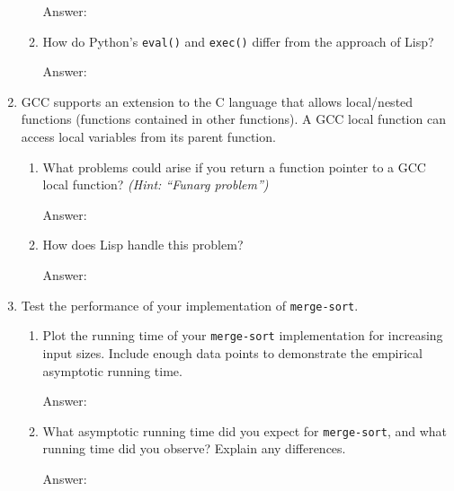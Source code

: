 \documentclass[12pt,letterpaper]{ntdhw}
\begin{document}
\begin{enumerate}
\begin{enumerate}
    \begin{emph}
      Answer: %
    \end{emph}

    \item How do Python's {\tt eval()} and {\tt exec()} differ from
    the approach of Lisp?

    \begin{emph}
      Answer: %
    \end{emph}
  \end{enumerate}

  \item GCC supports an extension to the C language that allows
  local/nested functions (functions contained in other functions).  A
  GCC local function can access local variables from its parent
  function.
  \begin{enumerate}
    \item What problems could arise if you return a function pointer
    to a GCC local function? \emph{(Hint: ``Funarg problem'')}

    \begin{emph}
      Answer: %
    \end{emph}

    \item How does Lisp handle this problem?

    \begin{emph}
      Answer: %
    \end{emph}

  \end{enumerate}


  \item Test the performance of your implementation of
    \texttt{merge-sort}.
    \begin{enumerate}
    \item Plot the running time of your \texttt{merge-sort}
      implementation for increasing input sizes.  Include enough data
      points to demonstrate the empirical asymptotic running time.

    \begin{emph}
      Answer: %
    \end{emph}

    \item What asymptotic running time did you expect for
      \texttt{merge-sort}, and what running time did you observe?
      Explain any differences.

    \begin{emph}
      Answer: %
    \end{emph}

    \end{enumerate}

\end{enumerate}
\end{document}
